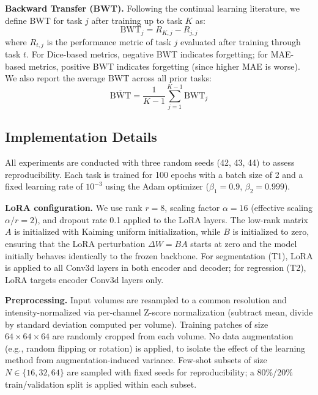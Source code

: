 \documentclass[journal,twoside,web]{ieeecolor}
\begin{document}
\textbf{Backward Transfer (BWT).} Following the continual learning literature, we define BWT for task $j$ after training up to task $K$ as:
\begin{equation}
\text{BWT}_j = R_{K,j} - R_{j,j}
\label{eq:bwt}
\end{equation}
where $R_{t,j}$ is the performance metric of task $j$ evaluated after training through task $t$. For Dice-based metrics, negative BWT indicates forgetting; for MAE-based metrics, positive BWT indicates forgetting (since higher MAE is worse). We also report the average BWT across all prior tasks:
\begin{equation}
\overline{\text{BWT}} = \frac{1}{K-1} \sum_{j=1}^{K-1} \text{BWT}_j
\label{eq:avg_bwt}
\end{equation}

\subsection{Implementation Details}
\label{sec:impl}

All experiments are conducted with three random seeds (42, 43, 44) to assess reproducibility. Each task is trained for 100 epochs with a batch size of 2 and a fixed learning rate of $10^{-3}$ using the Adam optimizer ($\beta_1=0.9$, $\beta_2=0.999$).

\textbf{LoRA configuration.} We use rank $r=8$, scaling factor $\alpha=16$ (effective scaling $\alpha/r = 2$), and dropout rate 0.1 applied to the LoRA layers. The low-rank matrix $A$ is initialized with Kaiming uniform initialization, while $B$ is initialized to zero, ensuring that the LoRA perturbation $\Delta W = BA$ starts at zero and the model initially behaves identically to the frozen backbone. For segmentation (T1), LoRA is applied to all Conv3d layers in both encoder and decoder; for regression (T2), LoRA targets encoder Conv3d layers only.

\textbf{Preprocessing.} Input volumes are resampled to a common resolution and intensity-normalized via per-channel Z-score normalization (subtract mean, divide by standard deviation computed per volume). Training patches of size $64\times64\times64$ are randomly cropped from each volume. No data augmentation (e.g., random flipping or rotation) is applied, to isolate the effect of the learning method from augmentation-induced variance. Few-shot subsets of size $N \in \{16, 32, 64\}$ are sampled with fixed seeds for reproducibility; a 80\%/20\% train/validation split is applied within each subset.
\end{document}
